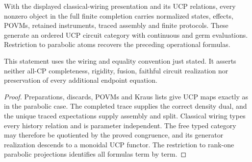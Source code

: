 \begin{theorem}
{\normalfont\statusProved}\quad
With the displayed classical-wiring presentation and its UCP relations,
every nonzero object in the full finite completion carries normalized
states, effects, POVMs, retained instruments, traced assembly and finite
protocols.  These generate an ordered UCP circuit category with continuous
and germ evaluations.  Restriction to parabolic atoms recovers the preceding
operational formulas.
\end{theorem}
\begin{scope}
This statement uses the wiring and equality convention just stated.  It
asserts neither all-CP completeness, rigidity, fusion, faithful
circuit realization nor preservation of every additional endpoint equation.
\end{scope}
\begin{proof}
Preparations, discards, POVMs and Kraus lists give UCP maps exactly as in the
parabolic case.  The completed trace supplies the correct density dual, and
the unique traced expectations supply assembly and split.  Classical wiring
types every history relation and is parameter independent.  The free typed
category may therefore be quotiented by the proved congruence, and its
generator realization descends to a monoidal UCP functor.  The restriction
to rank-one parabolic projections identifies all formulas term by term.
\end{proof}
